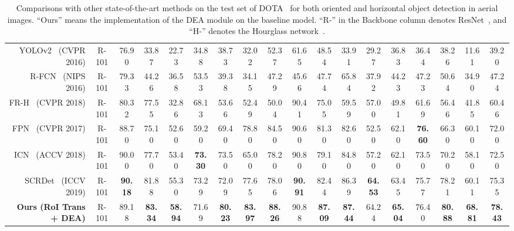 \documentclass[journal]{IEEEtran}
\begin{document}
\begin{table*}[!htb]
\begin{center}
\begin{threeparttable}
{\begin{tabular}{r|c|ccccccccccccccc|c}
				YOLOv2~\cite{redmon2016you} (CVPR 2016) & R-101 & 76.90 & 33.87 & 22.73 & 34.88 & 38.73 & 32.02 & 52.37 & 61.65 & 48.54 & 33.91 & 29.27 & 36.83 & 36.44 & 38.26 & 11.61 & 39.20 \\
				
				R-FCN~\cite{dai2016r} (NIPS 2016)& R-101 & 79.33	& 44.26 & 36.58 & 53.53 & 39.38 & 34.15 & 47.29 & 45.66 & 47.74 & 65.84 & 37.92 & 44.23 & 47.23 & 50.64 & 34.90 & 47.24 \\
				
				FR-H~\cite{xia2018dota} (CVPR 2018)& R-101 & 80.32 & 77.55 & 32.86 & 68.13 & 53.66 & 52.49 & 50.04 & 90.41 & 75.05 & 59.59 & 57.00 & 49.81 & 61.69 & 56.46 & 41.85 & 60.46 \\
				
				FPN~\cite{lin2017feature} (CVPR 2017)& R-101 & 88.70	& 75.10 & 52.60 & 59.20 & 69.40 & 78.80 & 84.50 & 90.60 & 81.30 & 82.60 & 52.50 & 62.10 & \textbf{76.60} & 66.30 & 60.10 & 72.00 \\
				
				ICN~\cite{azimi2018towards} (ACCV 2018) & R-101 & 90.00	& 77.70 & 53.40 & \textbf{73.30 }& 73.50 & 65.00 & 78.20 & 90.80 & 79.10 & 84.80 & 57.20 & 62.10 & 73.50 & 70.20 & 58.10 & 72.50 \\
				
				SCRDet~\cite{yang2019scrdet} (ICCV 2019) & R-101 &\textbf{ 90.18} & 81.88 & 55.30 & 73.29 & 72.09 & 77.65 & 78.06 & \textbf{90.91} & 82.44 & 86.39 & \textbf{64.53} & 63.45 & 75.77 & 78.21 & 60.11 & 75.35 \\
				
				\textbf{Ours (RoI Trans + DEA)} & R-101 & 89.18 & \textbf{83.34} & \textbf{58.94} & 71.69 &\textbf{80.23} & \textbf{83.97} & \textbf{88.26} & 90.88 & \textbf{87.09} & \textbf{87.44} & 64.24 & \textbf{65.04} & 76.40 & \textbf{80.88} & \textbf{68.81} & \textbf{78.43}\\
				\hline
				\hline
			\end{tabular}
		}
		\end{threeparttable}
	\end{center}
	\caption{Comparisons with other state-of-the-art methods on the test set of DOTA~\cite{xia2018dota} for both oriented and horizontal object detection in aerial images. ``Ours'' means the implementation of the DEA module on the baseline model. ``R-'' in the Backbone column denotes ResNet~\cite{he2016deep}, and ``H-'' denotes the Hourglass network~\cite{newell2016stacked}.}
	\label{t3}
\end{table*}
\end{document}
